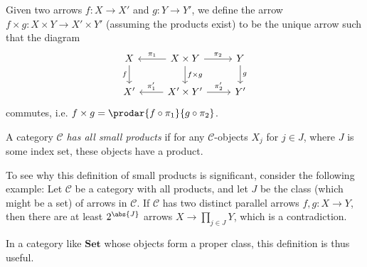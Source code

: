 \documentclass[article, a4paper, 11pt, oneside]{memoir}
\numberwithin{equation}{chapter}
\newcommand{\cat}[1]{\mathcal{#1}}
\newcommand{\ncat}[1]{\mathbf{#1}} %
\newcommand{\catSet}{\ncat{Set}}
\newcommand{\catC}{\cat{C}}
\begin{document}
Given two arrows $f \colon X \to X'$ and $g \colon Y \to Y'$, we define the arrow $f \times g \colon X \times Y \to X' \times Y'$ (assuming the products exist) to be the unique arrow such that the diagram
%
\begin{equation*}
    \begin{tikzcd}
        X
            \ar[d, "f", swap]
        & X \times Y
            \ar[l, "\pi_1", swap]
            \ar[r, "\pi_2"]
            \ar[d, "f \times g"]
        & Y
            \ar[d, "g"]
        \\
        X'
        & X' \times Y'
            \ar[l, "\pi'_1", swap]
            \ar[r, "\pi'_2"]
        & Y'
    \end{tikzcd}
\end{equation*}
%
commutes, i.e. $f \times g = \prodar{f \circ \pi_1}{g \circ \pi_2}$.




\begin{definition}
    A category $\catC$ \emph{has all small products} if for any $\catC$-objects $X_j$ for $j \in J$, where $J$ is some index set, these objects have a product.
\end{definition}

\begin{remark}
    To see why this definition of small products is significant, consider the following example: Let $\catC$ be a category with all products, and let $J$ be the class (which might be a set) of arrows in $\catC$. If $\catC$ has two distinct parallel arrows $f,g \colon X \to Y$, then there are at least $2^{\abs{J}}$ arrows $X \to \prod_{j \in J} Y$, which is a contradiction.

    In a category like $\catSet$ whose objects form a proper class, this definition is thus useful.
\end{remark}
\end{document}
